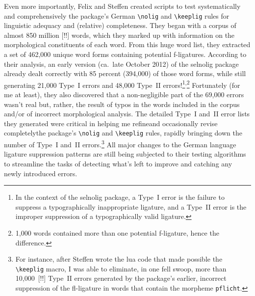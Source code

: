 \documentclass[11pt]{article}
\newcommand{\pkg}[1]{\textsf{#1}}
\newcommand{\opt}[1]{\texttt{#1}}
\newcommand{\cmmd}[1]{\texttt{\textbackslash #1}}
\begin{document}
Even more importantly, Felix and Steffen created scripts to test systematically and comprehensively the package's German \cmmd{nolig} and \cmmd{keeplig} rules for linguistic adequacy and (relative) completeness.
They began with a corpus of almost 850 million [!!] words, which they marked up with information on the morphological constituents of each word. From this huge word list, they extracted a set of 462,000 unique word forms containing potential f-ligatures.
According to their analysis, an early version (ca.\ late October 2012) of the \pkg{selnolig} package already dealt correctly with 85 percent (394,000) of those word forms, while still generating 21,000 Type~I errors and 48,000 Type~II errors!\footnote{In the context of the \pkg{selnolig} package, a Type~I error is the failure to suppress a typographically inappropriate ligature, and a Type~II error is the improper suppression of a typographically valid ligature.}\textsuperscript{,}\footnote{1,000 words contained more than one potential f-ligature, hence the difference.} 
Fortunately (for me at least), they also discovered that a non-negligible part of the 69,000 errors wasn't real but, rather, the result of typos in the words included in the corpus and/or of incorrect morphological analysis. The detailed Type~I and~II error lists they generated were critical in helping me refine\textemdash and occasionally revise completely\textemdash the package's \cmmd{nolig} and \cmmd{keeplig} rules, rapidly bringing down the number of Type~I and~II errors.\footnote{For instance, after Steffen wrote the lua code that made possible the \cmmd{keeplig} macro, I was able to eliminate, in one fell swoop, more than 10,000~[!!] Type~II errors generated by the package's earlier, incorrect suppression of the fl-ligature in words that contain the morpheme \opt{pflicht}. } All major changes to the German language ligature suppression patterns are still being subjected to their testing algorithms to streamline the tasks of detecting what's left to improve and catching any newly introduced errors.
\end{document}
